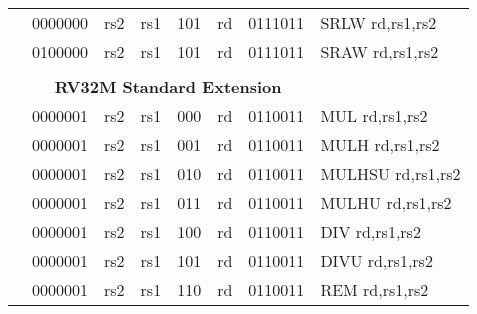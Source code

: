 \begin{table}[p]
\begin{small}
\begin{center}
\begin{tabular}{p{0in}p{0.4in}p{0.05in}p{0.05in}p{0.05in}p{0.05in}p{0.4in}p{0.6in}p{0.4in}p{0.6in}p{0.7in}l}
&
\multicolumn{4}{|c|}{0000000} &
\multicolumn{2}{c|}{rs2} &
\multicolumn{1}{c|}{rs1} &
\multicolumn{1}{c|}{101} &
\multicolumn{1}{c|}{rd} &
\multicolumn{1}{c|}{0111011} & SRLW rd,rs1,rs2 \\
\cline{2-11}
  

&
\multicolumn{4}{|c|}{0100000} &
\multicolumn{2}{c|}{rs2} &
\multicolumn{1}{c|}{rs1} &
\multicolumn{1}{c|}{101} &
\multicolumn{1}{c|}{rd} &
\multicolumn{1}{c|}{0111011} & SRAW rd,rs1,rs2 \\
\cline{2-11}
  

&
\multicolumn{10}{c}{} & \\
&
\multicolumn{10}{c}{\bf RV32M Standard Extension} & \\
\cline{2-11}
  

&
\multicolumn{4}{|c|}{0000001} &
\multicolumn{2}{c|}{rs2} &
\multicolumn{1}{c|}{rs1} &
\multicolumn{1}{c|}{000} &
\multicolumn{1}{c|}{rd} &
\multicolumn{1}{c|}{0110011} & MUL rd,rs1,rs2 \\
\cline{2-11}
  

&
\multicolumn{4}{|c|}{0000001} &
\multicolumn{2}{c|}{rs2} &
\multicolumn{1}{c|}{rs1} &
\multicolumn{1}{c|}{001} &
\multicolumn{1}{c|}{rd} &
\multicolumn{1}{c|}{0110011} & MULH rd,rs1,rs2 \\
\cline{2-11}
  

&
\multicolumn{4}{|c|}{0000001} &
\multicolumn{2}{c|}{rs2} &
\multicolumn{1}{c|}{rs1} &
\multicolumn{1}{c|}{010} &
\multicolumn{1}{c|}{rd} &
\multicolumn{1}{c|}{0110011} & MULHSU rd,rs1,rs2 \\
\cline{2-11}
  

&
\multicolumn{4}{|c|}{0000001} &
\multicolumn{2}{c|}{rs2} &
\multicolumn{1}{c|}{rs1} &
\multicolumn{1}{c|}{011} &
\multicolumn{1}{c|}{rd} &
\multicolumn{1}{c|}{0110011} & MULHU rd,rs1,rs2 \\
\cline{2-11}
  

&
\multicolumn{4}{|c|}{0000001} &
\multicolumn{2}{c|}{rs2} &
\multicolumn{1}{c|}{rs1} &
\multicolumn{1}{c|}{100} &
\multicolumn{1}{c|}{rd} &
\multicolumn{1}{c|}{0110011} & DIV rd,rs1,rs2 \\
\cline{2-11}
  

&
\multicolumn{4}{|c|}{0000001} &
\multicolumn{2}{c|}{rs2} &
\multicolumn{1}{c|}{rs1} &
\multicolumn{1}{c|}{101} &
\multicolumn{1}{c|}{rd} &
\multicolumn{1}{c|}{0110011} & DIVU rd,rs1,rs2 \\
\cline{2-11}
  

&
\multicolumn{4}{|c|}{0000001} &
\multicolumn{2}{c|}{rs2} &
\multicolumn{1}{c|}{rs1} &
\multicolumn{1}{c|}{110} &
\multicolumn{1}{c|}{rd} &
\multicolumn{1}{c|}{0110011} & REM rd,rs1,rs2 \\
\cline{2-11}
  


\end{tabular}
\end{center}
\end{small}
\end{table}

